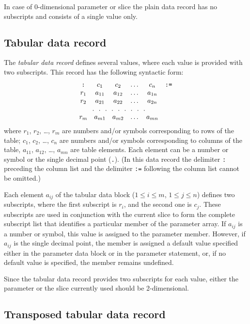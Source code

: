\documentclass[11pt]{report}
\begin{document}
In case of 0-dimensional parameter or slice the plain data record has
no subscripts and consists of a single value only.

\subsection{Tabular data record}

The {\it tabular data record} defines several values, where each value
is provided with two subscripts. This record has the following
syntactic form:
$$\begin{array}{cccccc}
\mbox{{\tt:}}&c_1&c_2&\dots&c_n&\mbox{{\tt:=}}\\
r_1&a_{11}&a_{12}&\dots&a_{1n}&\\
r_2&a_{21}&a_{22}&\dots&a_{2n}&\\
\multicolumn{5}{c}{.\ \ .\ \ .\ \ .\ \ .\ \ .\ \ .\ \ .\ \ .}&\\
r_m&a_{m1}&a_{m2}&\dots&a_{mn}&\\
\end{array}$$
where $r_1$, $r_2$, \dots, $r_m$ are numbers and/or symbols
corresponding to rows of the table; $c_1$, $c_2$, \dots, $c_n$ are
numbers and/or symbols corresponding to columns of the table, $a_{11}$,
$a_{12}$, \dots, $a_{mn}$ are table elements. Each element can be a
number or symbol or the single decimal point ({\tt.}). (In this data
record the delimiter {\tt:} preceding the column list and the delimiter
{\tt:=} following the column list cannot be omitted.)

Each element $a_{ij}$ of the tabular data block ($1\leq i\leq m$,
$1\leq j\leq n$) defines two subscripts, where the first subscript is
$r_i$, and the second one is $c_j$. These subscripts are used in
conjunction with the current slice to form the complete subscript list
that identifies a particular member of the parameter array. If $a_{ij}$
is a number or symbol, this value is assigned to the parameter member.
However, if $a_{ij}$ is the single decimal point, the member is
assigned a default value specified either in the parameter data block
or in the parameter statement, or, if no default value is specified,
the member remains undefined.

Since the tabular data record provides two subscripts for each value,
either the parameter or the slice currently used should be
2-dimensional.

\subsection{Transposed tabular data record}
\end{document}
